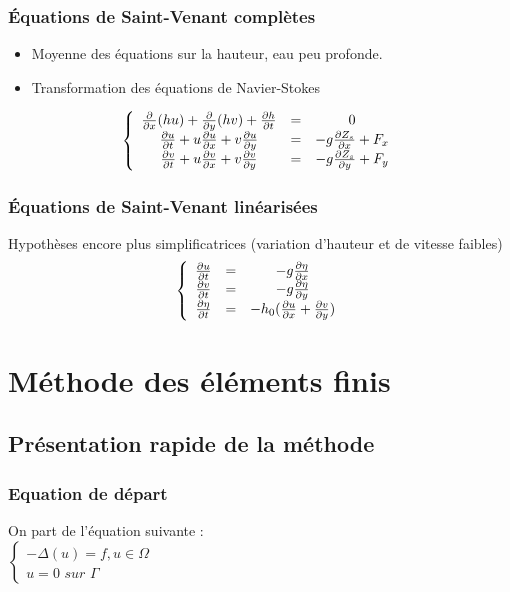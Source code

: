 \documentclass[handout]{beamer}
\begin{document}
\begin{frame}
	\frametitle{Équations de Saint-Venant complètes}
	\begin{itemize}
		\item Moyenne des équations sur la hauteur, eau peu profonde.
		\item Transformation des équations de Navier-Stokes
	\end{itemize}

	\[	\left\{ \begin{array}{c c c}
	\frac{\partial}{\partial x} (hu) + \frac{\partial}{\partial y} (hv) + \frac{\partial h}{\partial t} &=& 0 \\
      \frac{\partial u}{\partial t} + u\frac{\partial u}{\partial x} + v\frac{\partial u}{\partial y} &=& -g\frac{\partial Z_s}{\partial x} + F_x\\
	 \frac{\partial v}{\partial t} + u\frac{\partial v}{\partial x} + v\frac{\partial v}{\partial y}&=& -g\frac{\partial Z_s}{\partial y} + F_y
	\end{array}\right.	\]
\end{frame}

\begin{frame}
	\frametitle{Équations de Saint-Venant linéarisées}
	Hypothèses encore plus simplificatrices (variation d'hauteur et de vitesse faibles)
	\[	\left\{ 
	\begin{array}{c c c}
		\frac{\partial u}{\partial t}	& = & -g \frac{\partial \eta}{\partial x}\\
		\frac{\partial v}{\partial t} & = & -g  \frac{\partial \eta}{\partial y}\\
      \frac{\partial \eta}{\partial t} & = & - h_0  (\frac{\partial u}{\partial x}+\frac{\partial v}{\partial y} )\\
		
		
	\end{array}
	\right.\]
\end{frame}

\section{Méthode des éléments finis}
\subsection[Présentation]{Présentation rapide de la méthode}
\begin{frame}
	\frametitle{Equation de départ}
	On part de l'équation suivante :\\
	$\left\{\begin{matrix}
		-\Delta\left(u\right)=f, u\in\Omega\\
		u=0 \textit{ sur } \Gamma
		\end{matrix}\right.$
\end{frame}
\end{document}
